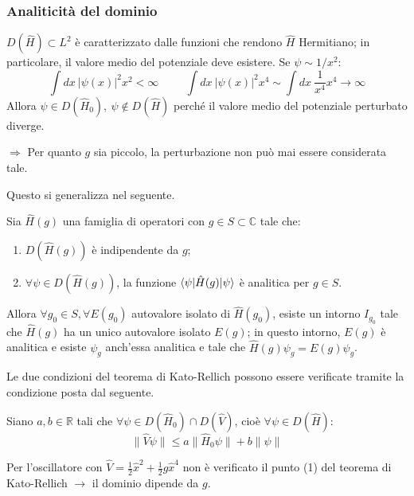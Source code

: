 \documentclass[10pt]{beamer}
\begin{document}
   \begin{frame}
	   \frametitle{Analiticit\`a del dominio}\pause
	   $D(\hat{H}) \subset L^2$ \`e caratterizzato dalle funzioni che rendono $\hat{H}$ Hermitiano; in particolare, il valore medio del potenziale deve esistere.\pause
	   Se $\psi \sim 1/x^2$:
	   \begin{equation*}
	   	\int dx \ \lvert \psi (x) \rvert ^2 x^2 < \infty \hspace{1cm} \int dx\ \lvert \psi (x) \rvert ^2 x^4 \sim \int dx\  \frac{1}{x^4}x^4 \to \infty
	   \end{equation*}\pause
	   Allora $\psi \in D(\hat{H}_0),\ \psi \not \in D(\hat{H})$ perch\'e il valore medio del potenziale perturbato diverge.\pause

	   $\Rightarrow $ Per quanto $g$ sia piccolo, la perturbazione non pu\`o mai essere considerata tale.\pause

	   Questo si generalizza nel seguente.
	   \begin{theorem}
		   Sia $\hat{H}(g)$ una famiglia di operatori con $g \in S \subset \mathbb{C}$ tale che:\pause
		   \begin{enumerate}[1]
		   	\item $D(\hat{H}(g))$ \`e indipendente da $g$;\pause
			\item $\forall \psi \in D(\hat{H}(g))$, la funzione $\braket{\psi |\hat{H}(g)|\psi } $ \`e analitica per $g \in S$.\pause
		   \end{enumerate}  
		   Allora $\forall g_0\in S, \forall E(g_0)$ autovalore isolato di $\hat{H}(g_0)$, esiste un intorno $I_{g_0} $ tale che $\hat{H}(g)$ ha un unico autovalore isolato $E(g)$; in questo intorno, $E(g)$ \`e analitica e esiste $\psi _g$ anch'essa analitica e tale che $\hat{H}(g) \psi _g = E(g) \psi _g$.
	   \end{theorem}
   \end{frame} 
   \begin{frame}
	   Le due condizioni del teorema di Kato-Rellich possono essere verificate tramite la condizione posta dal seguente.\pause
   	\begin{theorem}
Siano $a,b \in \mathbb{R}$ tali che $\forall \psi \in D(\hat{H}_0) \cap D(\hat{V})$, cio\`e $\forall \psi  \in D(\hat{H})$:\pause
\begin{equation*}
	\lVert \hat{V}\psi  \rVert \le  a \lVert \hat{H}_0 \psi  \rVert + b \lVert \psi  \rVert 
\end{equation*}
   	\end{theorem}\pause
	Per l'oscillatore con $\hat{V} = \frac{1}{2} \hat{x}^2 + \frac{1}{2}g \hat{x}^4$ non \`e verificato il punto (1) del teorema di Kato-Rellich $\longrightarrow$ il dominio dipende da $g$.
   \end{frame}
\end{document}
